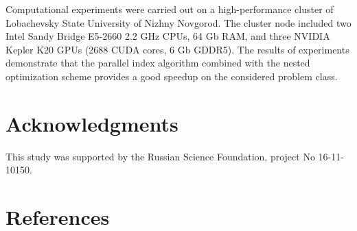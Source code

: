 \documentclass[a4paper]{jpconf}
\begin{document}
Computational experiments were carried out on a high-performance cluster of 
Lobachevsky State University of Nizhny Novgorod. The cluster node included 
two Intel Sandy Bridge E5-2660 2.2 GHz CPUs, 64 Gb RAM, and three NVIDIA 
Kepler K20 GPUs (2688 CUDA cores, 6 Gb GDDR5). 
The results of experiments demonstrate that the parallel index algorithm combined with the nested optimization scheme provides a good speedup on the considered problem class. 


\section*{Acknowledgments}
This study was supported by the Russian Science Foundation, project No 16-11-10150.

\section*{References}

\medskip
\end{document}
